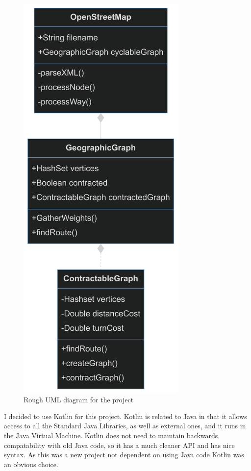 \documentclass[11pt,twoside,a4paper]{report}
\begin{document}
\begin{figure}[p]
    \begin{center}
        \includegraphics[height=21cm]{classdiagram.png}
    \end{center}
    \caption{Rough UML diagram for the project}
    \label{uml}
\end{figure}
I decided to use Kotlin for this project. Kotlin is related to Java in that it allows access to all the Standard Java Libraries, as well
as external ones, and it runs in the Java Virtual Machine. Kotlin does not need to maintain backwards compatability with old Java code,
so it has a much cleaner API and has nice syntax. As this was a new project not dependent on using Java code Kotlin was an obvious choice. 
\end{document}
